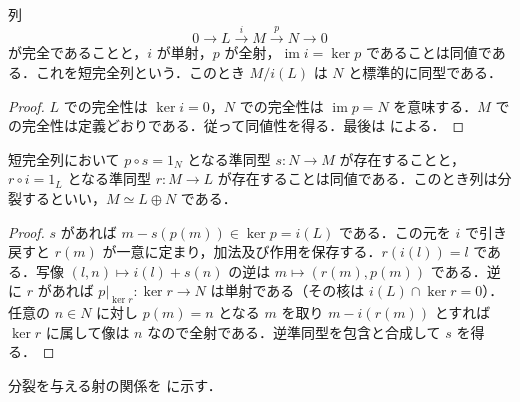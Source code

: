 \begin{prop}[短完全列と商加群]
列
\[
 0\longrightarrow L\xrightarrow{i}M\xrightarrow{p}N\longrightarrow0
\]
が完全であることと，$i$ が単射，$p$ が全射，$\operatorname{im}i=\ker p$ であることは同値である．これを短完全列という．このとき $M/i(L)$ は $N$ と標準的に同型である．
\end{prop}
\begin{proof}
$L$ での完全性は $\ker i=0$，$N$ での完全性は $\operatorname{im}p=N$ を意味する．$M$ での完全性は定義どおりである．従って同値性を得る．最後は  による．
\end{proof}
\begin{prop}[短完全列の分裂]
短完全列において $p\circ s=1_N$ となる準同型 $s:N\to M$ が存在することと，$r\circ i=1_L$ となる準同型 $r:M\to L$ が存在することは同値である．このとき列は分裂するといい，$M\simeq L\oplus N$ である．
\end{prop}
\begin{proof}
$s$ があれば $m-s(p(m))\in\ker p=i(L)$ である．この元を $i$ で引き戻すと $r(m)$ が一意に定まり，加法及び作用を保存する．$r(i(l))=l$ である．写像 $(l,n)\mapsto i(l)+s(n)$ の逆は $m\mapsto(r(m),p(m))$ である．逆に $r$ があれば $p|_{\ker r}:\ker r\to N$ は単射である（その核は $i(L)\cap\ker r=0$）．任意の $n\in N$ に対し $p(m)=n$ となる $m$ を取り $m-i(r(m))$ とすれば $\ker r$ に属して像は $n$ なので全射である．逆準同型を包含と合成して $s$ を得る．
\end{proof}
分裂を与える射の関係を  に示す．
